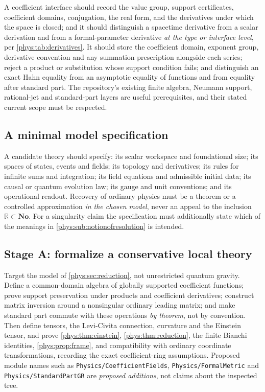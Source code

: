 \documentclass[11pt,letterpaper]{article}
\numberwithin{equation}{section}
\theoremstyle{definition}
\theoremstyle{remark}
\newcommand{\No}{\mathbf{No}}
\newcommand{\R}{\mathbb R}
\begin{document}
A coefficient interface should record the value group, support certificates,
coefficient domains, conjugation, the real form, and the derivatives under
which the space is closed; and it should distinguish a spacetime derivative
from a scalar derivation and from a formal-parameter derivative \emph{at the
type or interface level}, per \cref{phys:tab:derivatives}. It should store the
coefficient domain, exponent group, derivative convention and any summation
prescription alongside each series; reject a product or substitution whose
support condition fails; and distinguish an exact Hahn equality from an
asymptotic equality of functions and from equality after standard part. The
repository's existing finite algebra, Neumann support, rational-jet and
standard-part layers are useful prerequisites, and their stated current scope
must be respected.

\subsection{A minimal model specification}
\label{phys:sub:minimalspec}

A candidate theory should specify: its scalar workspace and foundational size;
its spaces of states, events and fields; its topology and derivatives; its
rules for infinite sums and integration; its field equations and admissible
initial data; its causal or quantum evolution law; its gauge and unit
conventions; and its operational readout. Recovery of ordinary physics must be
a theorem or a controlled approximation \emph{in the chosen model}, never an
appeal to the inclusion $\R\subset\No$. For a singularity claim the
specification must additionally state which of the meanings in
\cref{phys:sub:notionofresolution} is intended.

\subsection{Stage A: formalize a conservative local theory}
\label{phys:sub:stageA}

Target the model of \cref{phys:sec:reduction}, not unrestricted quantum
gravity. Define a common-domain algebra of globally supported coefficient
functions; prove support preservation under products and coefficient
derivatives; construct matrix inversion around a nonsingular ordinary leading
matrix; and make standard part commute with these operations \emph{by theorem},
not by convention. Then define tensors, the Levi-Civita connection, curvature
and the Einstein tensor, and prove \cref{phys:thm:einstein},
\cref{phys:thm:reduction}, the finite Bianchi identities,
\cref{phys:prop:frame}, and compatibility with ordinary coordinate
transformations, recording the exact coefficient-ring assumptions. Proposed
module names such as \texttt{Physics/CoefficientFields},
\texttt{Physics/FormalMetric} and \texttt{Physics/StandardPartGR} are
\emph{proposed additions}, not claims about the inspected tree.
\end{document}

